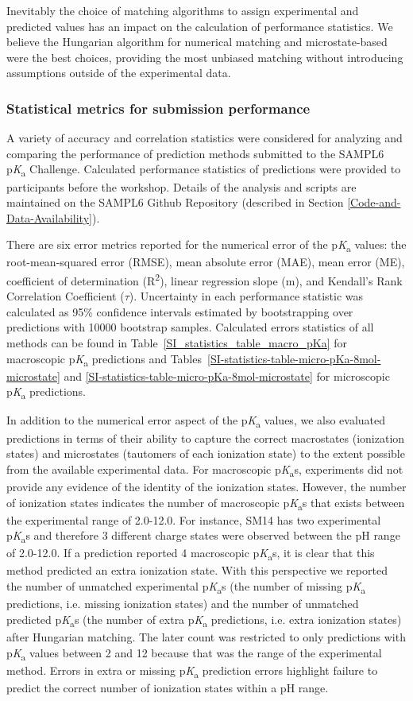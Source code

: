 \documentclass[9pt,lineno,final]{elife}
\newcommand{\pKa}{p\textit{K}\textsubscript{a}}
\begin{document}
Inevitably the choice of matching algorithms to assign experimental and predicted values has an impact on the calculation of performance statistics. We believe the Hungarian algorithm for numerical matching and microstate-based were the best choices, providing the most unbiased matching without introducing assumptions outside of the experimental data.


\subsubsection{Statistical metrics for submission performance}

A variety of accuracy and correlation statistics were considered for analyzing and comparing the performance of prediction methods submitted to the SAMPL6 \pKa{} Challenge. 
Calculated performance statistics of predictions were provided to participants before the workshop. 
Details of the analysis and scripts are maintained on the SAMPL6 Github Repository (described in Section \ref{Code-and-Data-Availability}).

There are six error metrics reported for the numerical error of the \pKa{} values: the root-mean-squared error (RMSE), mean absolute error (MAE), mean error (ME), coefficient of determination (R\textsuperscript{2}), linear regression slope (m), and Kendall’s Rank Correlation Coefficient ($\tau$).
Uncertainty in each performance statistic was calculated as 95\% confidence intervals estimated by bootstrapping over predictions with 10000 bootstrap samples. 
Calculated errors statistics of all methods can be found in Table~\ref{SI_statistics_table_macro_pKa} for macroscopic \pKa{} predictions and Tables~\ref{SI-statistics-table-micro-pKa-8mol-microstate} and \ref{SI-statistics-table-micro-pKa-8mol-microstate} for microscopic \pKa{} predictions. 

In addition to the numerical error aspect of the \pKa{} values, we also evaluated predictions in terms of their ability to capture the correct macrostates (ionization states) and microstates (tautomers of each ionization state) to the extent possible from the available experimental data. 
For macroscopic \pKa{}s,
experiments did not provide any evidence of the identity of the ionization states. 
However, the number of ionization states indicates the number of macroscopic \pKa{}s that exists between the experimental range of 2.0-12.0. 
For instance, SM14 has two experimental \pKa{}s and therefore 3 different charge states were observed between the pH range of 2.0-12.0. 
If a prediction reported 4 macroscopic \pKa{}s, it is clear that this method predicted an extra ionization state. 
With this perspective we reported the number of unmatched experimental \pKa{}s (the number of missing \pKa{} predictions, i.e. missing ionization states) and the number of unmatched predicted \pKa{}s (the number of extra \pKa{} predictions, i.e. extra ionization states) after Hungarian matching. 
The later count was restricted to only predictions with \pKa{} values between 2 and 12 because that was the range of the experimental method. 
Errors in extra or missing \pKa{} prediction errors highlight failure to predict the correct number of ionization states within a pH range.
\end{document}
